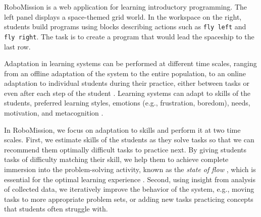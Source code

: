 
%
  {RoboMission is a web application for learning introductory programming.
   The left panel displays a space-themed grid world. In the workspace on
   the right, students build programs using blocks describing actions
   such as \texttt{fly left} and \texttt{fly right}.
   The task is to create a program that would lead the spaceship to the last row.}

Adaptation in learning systems can be performed at different time scales,
ranging from an offline adaptation of the system to the entire population, %
to an online adaptation to individual students during their practice,
either between tasks or even after each step of the student
\cite{adaptive-learning-grid}.
Learning systems can adapt to skills of the students, preferred learning styles,
emotions (e.g., frustration, boredom), needs, motivation, and metacognition
\cite{affect-sensor-free,its-review-2010}.

In RoboMission, we focus on adaptation to skills and perform it at two time scales.
First, we estimate skills of the students as they solve tasks
so that we can recommend them optimally difficult tasks to practice next.
By giving students tasks of difficulty matching their skill,
we help them to achieve complete immersion into the problem-solving
activity, known as  %
the \emph{state of flow} \cite{flow},
which is essential for the optimal learning experience
\cite{adaptive-practice}.
Second, using insight from analysis of collected data,
we iteratively improve the behavior of the system,
e.g., moving tasks to more appropriate problem sets,
or adding new tasks practicing concepts that students often struggle with.



